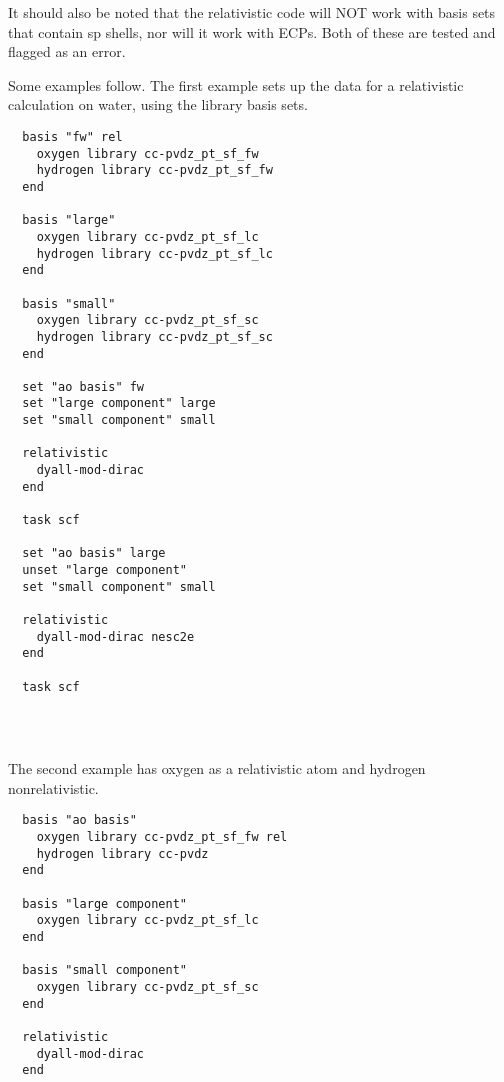 It should also be noted that the relativistic code will NOT work with basis
sets that contain sp shells, nor will it work with ECPs. Both of these are
tested and flagged as an error.

Some examples follow. The first example sets up the data for a relativistic
calculation on water, using the library basis sets.

\begin{verbatim}
  basis "fw" rel
    oxygen library cc-pvdz_pt_sf_fw
    hydrogen library cc-pvdz_pt_sf_fw
  end

  basis "large"
    oxygen library cc-pvdz_pt_sf_lc
    hydrogen library cc-pvdz_pt_sf_lc
  end

  basis "small"
    oxygen library cc-pvdz_pt_sf_sc
    hydrogen library cc-pvdz_pt_sf_sc
  end

  set "ao basis" fw
  set "large component" large
  set "small component" small

  relativistic
    dyall-mod-dirac
  end

  task scf

  set "ao basis" large
  unset "large component"
  set "small component" small

  relativistic
    dyall-mod-dirac nesc2e
  end

  task scf




\end{verbatim}

The second example has oxygen as a relativistic atom and hydrogen nonrelativistic.

\begin{verbatim}
  basis "ao basis"
    oxygen library cc-pvdz_pt_sf_fw rel
    hydrogen library cc-pvdz
  end

  basis "large component"
    oxygen library cc-pvdz_pt_sf_lc
  end

  basis "small component"
    oxygen library cc-pvdz_pt_sf_sc
  end

  relativistic
    dyall-mod-dirac
  end
\end{verbatim}
